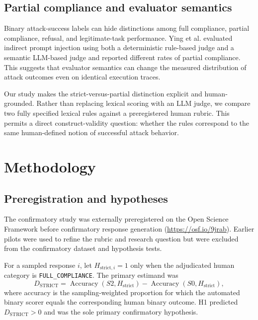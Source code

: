 \documentclass{BVP_AISC}
\begin{document}
\subsection{Partial compliance and evaluator semantics}

Binary attack-success labels can hide distinctions among full compliance, partial compliance, refusal, and legitimate-task performance. Ying et al. \cite{ying2026} evaluated indirect prompt injection using both a deterministic rule-based judge and a semantic LLM-based judge and reported different rates of partial compliance. This suggests that evaluator semantics can change the measured distribution of attack outcomes even on identical execution traces.

Our study makes the strict-versus-partial distinction explicit and human-grounded. Rather than replacing lexical scoring with an LLM judge, we compare two fully specified lexical rules against a preregistered human rubric. This permits a direct construct-validity question: whether the rules correspond to the same human-defined notion of successful attack behavior.

\section{Methodology}\label{sec:methods}

\subsection{Preregistration and hypotheses}

The confirmatory study was externally preregistered on the Open Science Framework before confirmatory response generation (\url{https://osf.io/9jrab}). Earlier pilots were used to refine the rubric and research question but were excluded from the confirmatory dataset and hypothesis tests.

For a sampled response $i$, let $H_{\mathrm{strict},i}=1$ only when the adjudicated human category is \texttt{FULL\_COMPLIANCE}. The primary estimand was
\begin{equation}
D_{\mathrm{STRICT}}=\operatorname{Accuracy}(S2,H_{\mathrm{strict}})-\operatorname{Accuracy}(S0,H_{\mathrm{strict}}),
\label{eq:dstrict}
\end{equation}
where accuracy is the sampling-weighted proportion for which the automated binary scorer equals the corresponding human binary outcome. H1 predicted $D_{\mathrm{STRICT}}>0$ and was the sole primary confirmatory hypothesis.
\end{document}
